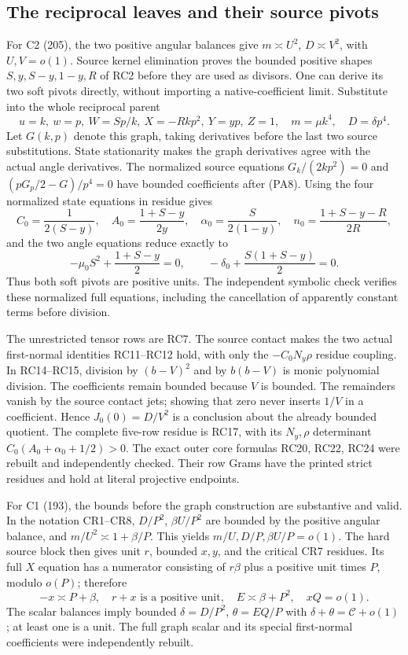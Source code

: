 \subsection{The reciprocal leaves and their source pivots}

For C2 (205), the two positive angular balances give
$m\asymp U^2$, $D\asymp V^2$, with $U,V=o(1)$.
Source kernel elimination proves the bounded positive shapes
$S,y,S-y,1-y,R$ of RC2 before they are used as divisors.
One can derive its two soft pivots directly, without importing a
native-coefficient limit.  Substitute into the whole reciprocal
parent
\[
 u=k,\ w=p,\ W=Sp/k,\ X=-Rkp^2,\ Y=yp,\ Z=1,
 \quad m=\mu k^4,\quad D=\delta p^4.                \tag{PA8}
\]
Let $G(k,p)$ denote this graph, taking derivatives before the
last two source substitutions.  State stationarity makes the
graph derivatives agree with the actual angle derivatives.
The normalized source equations $G_k/(2kp^2)=0$ and
$(pG_p/2-G)/p^4=0$ have bounded coefficients after (PA8).
Using the four normalized state equations in residue gives
\[
 C_0=\frac1{2(S-y)},\quad A_0=\frac{1+S-y}{2y},\quad
 \alpha_0=\frac S{2(1-y)},\quad
 n_0=\frac{1+S-y-R}{2R},
\]
and the two angle equations reduce exactly to
\[
 -\mu_0 S^2+\frac{1+S-y}{2}=0,\qquad
 -\delta_0+\frac{S(1+S-y)}2=0.                      \tag{PA9}
\]
Thus both soft pivots are positive units.  The independent
symbolic check verifies these normalized full equations, including
the cancellation of apparently constant terms before division.

The unrestricted tensor rows are RC7.  The source contact makes
the two actual first-normal identities RC11--RC12 hold, with
only the $-C_0N_y\rho$ residue coupling.  In RC14--RC15,
division by $(b-V)^2$ and by $b(b-V)$ is monic polynomial
division.  The coefficients remain bounded because $V$ is
bounded.  The remainders vanish by the source contact jets;
showing that zero never inserts $1/V$ in a coefficient.  Hence
$J_0(0)=D/V^2$ is a conclusion about the already bounded
quotient.  The complete five-row residue is RC17, with its
$N_y,\rho$ determinant $C_0(A_0+\alpha_0+1/2)>0$.
The exact outer core formulas RC20, RC22, RC24 were rebuilt
and independently checked.  Their row Grams have the printed
strict residues and hold at literal projective endpoints.

For C1 (193), the bounds before the graph construction are
substantive and valid.  In the notation CR1--CR8,
$D/P^2$, $\beta U/P^2$ are bounded by the positive angular
balance, and $m/U^2\asymp1+\beta/P$.  This yields
$m/U,D/P,\beta U/P=o(1)$.  The hard source block then gives
unit $r$, bounded $x,y$, and the critical CR7 residues.  Its
full $X$ equation has a numerator consisting of $r\beta$ plus
a positive unit times $P$, modulo $o(P)$; therefore
\[
 -x\asymp P+\beta,\quad r+x\text{ is a positive unit},
 \quad E\asymp\beta+P^2,\quad xQ=o(1).              \tag{PA10}
\]
The scalar balances imply bounded $\delta=D/P^2$,
$\theta=EQ/P$ with $\delta+\theta=\mathcal C+o(1)$;
at least one is a unit.  The full graph scalar and its special
first-normal coefficients were independently rebuilt.

